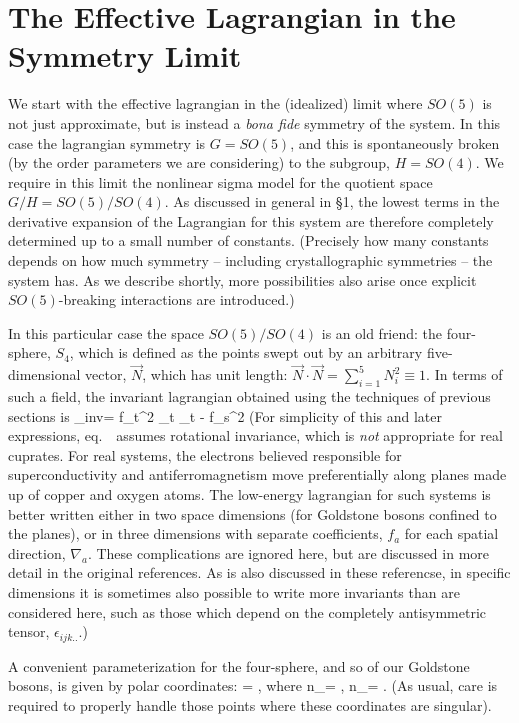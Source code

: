 \documentclass[12pt,epsf]{report}
\def\nq{n_\ssq}
\def\ns{n_\ssS}
\def\inv{{\rm inv}}
\begin{document}
\section{The Effective Lagrangian in the Symmetry Limit}

We start with the effective lagrangian in the (idealized)
limit where $SO(5)$ is not just approximate, but is instead
a {\it bona fide} symmetry of the system. In this case the
lagrangian symmetry is $G = SO(5)$, and this is
spontaneously broken (by the order parameters we are
considering) to the subgroup, $H = SO(4)$. We require in
this limit the nonlinear sigma model for the quotient space
$G/H = SO(5)/SO(4)$. As discussed in general in \S1, the
lowest terms in the derivative expansion of the Lagrangian
for this system are therefore completely determined up to a
small number of constants. (Precisely how many constants
depends on how much symmetry -- including crystallographic
symmetries -- the system has. As we describe shortly, more
possibilities also arise once explicit $SO(5)$-breaking
interactions are introduced.)

In this particular case the space $SO(5)/SO(4)$ is an old
friend: the four-sphere, $S_4$, which is defined as the
points swept out by an arbitrary five-dimensional vector,
$\vec{N}$, which has unit length: $\vec{N} \cdot \vec{N} =
\sum_{i=1}^5 N_i^2 \equiv 1$. In terms of such a field, the
invariant lagrangian obtained using the techniques of
previous sections is
%
\eq
\label{simpinvlagr}
\Scl_\inv = {f_t^2 } \;
\partial_t  \cdot  \partial_t
  - {f_s^2 } \; \nabla
{} \cdot  \nabla  {}
\eeq
%
(For simplicity of this and later expressions, 
eq.~\ assumes rotational invariance,
which is 
{\it not} appropriate for real cuprates. For real systems,
the electrons believed responsible for superconductivity
and antiferromagnetism move preferentially along planes
made up of copper and oxygen atoms. The low-energy
lagrangian for such systems is better written either in two
space dimensions (for Goldstone bosons confined to the
planes), or in three dimensions with separate coefficients,
$f_a$ for each spatial direction, 
$\nabla_a$. These complications are ignored here, but are
discussed in more detail in the original references. As is
also discussed in these referencse, in specific dimensions
it is sometimes also possible to write more invariants than
are considered here, such as those which depend on the
completely antisymmetric tensor, $\epsilon_{ijk..}$.)

A convenient parameterization for the four-sphere, and so
of our Goldstone bosons, is given by polar coordinates:
%
\eq
\label{explangles}
 = \pmatrix{\nq \cr \ns \cr}, 
\qquad \hbox{where}
\qquad
\nq = \cos\theta  \pmatrix{\cos\phi 
\cr \sin\phi \cr}, \qquad
\ns = \sin\theta \pmatrix{ \sin\alpha 
\cos\beta \cr  \sin\alpha \sin\beta \cr
\cos\alpha\cr} .
\eeq
%
(As usual, care is required to properly handle those points
where these coordinates are singular).
\end{document}
